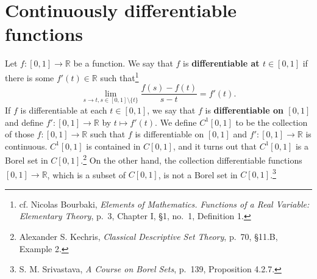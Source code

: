 \documentclass{article}
\theoremstyle{definition}
\theoremstyle{definition}
\begin{document}
\section{Continuously differentiable functions}
Let $f:[0,1] \to \mathbb{R}$ be a function. We say that $f$ is \textbf{differentiable at $t \in [0,1]$}
if  there is some $f'(t) \in \mathbb{R}$ such that\footnote{cf.
Nicolas Bourbaki, {\em Elements of Mathematics. Functions of a Real Variable: Elementary Theory},
p.~3, Chapter I, \S 1, no.~1, Definition 1.}
\[
\lim_{s \to t, s \in [0,1] \setminus \{t\}} \frac{f(s)-f(t)}{s-t} = f'(t).
\]
If $f$ is differentiable at each $t \in [0,1]$, we say that $f$ is \textbf{differentiable on $[0,1]$}
and define $f':[0,1] \to \mathbb{R}$ by $t \mapsto f'(t)$. 
We define $C^1[0,1]$ to be the collection of those $f:[0,1] \to \mathbb{R}$ such that
$f$ is differentiable on $[0,1]$ and $f':[0,1] \to \mathbb{R}$ is continuous.
$C^1[0,1]$ is contained in $C[0,1]$, and it turns out that $C^1[0,1]$ is a Borel set in $C[0,1]$.\footnote{Alexander S. Kechris, {\em Classical
Descriptive Set Theory}, p.~70, \S 11.B, Example 2.}
On the other hand, the collection differentiable functions $[0,1] \to \mathbb{R}$, which is a subset of $C[0,1]$,
 is not a Borel set in $C[0,1]$.\footnote{S. M. Srivastava, {\em A Course on Borel Sets}, p.~139, Proposition 4.2.7.}
\end{document}
